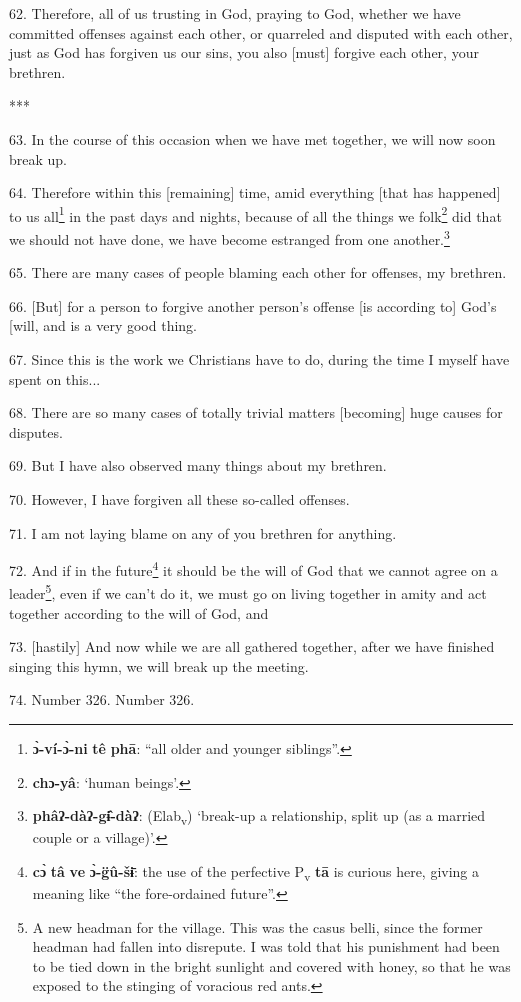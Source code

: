62. Therefore, all of us trusting in God, praying to God, whether we have committed
offenses against each other, or quarreled and disputed with each other, just as
God has forgiven us our sins, you also [must] forgive each other, your brethren.

***

63. In the course of this occasion when we have met together, we will now soon
break up.

64. Therefore within this [remaining] time, amid everything [that has happened]
to us all\footnote{\textbf{ɔ̀-ví-ɔ̀-ni} \textbf{tê} \textbf{phā}: ``all older and younger siblings''.} in the past days and nights, because of all the things we folk\footnote{\textbf{chɔ-yâ}: `human beings'.}
did that we should not have done, we have become estranged from one another.\footnote{\textbf{phâʔ-dàʔ-gɨ̂-dàʔ}: (Elab\textsubscript{v}) `break-up a relationship, split up (as a married couple or a village)'.}

65. There are many cases of people blaming each other for offenses, my brethren.

66. [But] for a person to forgive another person's offense [is according to] God's
[will, and is a very good thing.

67. Since this is the work we Christians have to do, during the time I myself have
spent on this...

68. There are so many cases of totally trivial matters [becoming] huge causes for
disputes.

69. But I have also observed many things about my brethren.

70. However, I have forgiven all these so-called offenses.

71. I am not laying blame on any of you brethren for anything.

72. And if in the future\footnote{\textbf{cɔ̀} \textbf{tâ} \textbf{ve} \textbf{ɔ̀-g̈û-šɨ̄}: the use of the perfective P\textsubscript{v} \textbf{tā} is curious here, giving a meaning like ``the fore-ordained future''.} it should be the will of God that we cannot agree on
a leader\footnote{A new headman for the village. This was the casus belli, since the former headman had fallen into disrepute. I was told that his punishment had been to be tied down in the bright sunlight and covered with honey, so that he was exposed to the stinging of voracious red ants.}, even if we can't do it, we must go on living together in amity and
act together according to the will of God, and 

73. [hastily] And now while we are all gathered together, after we have finished
singing this hymn, we will break up the meeting.

74. Number 326. Number 326.


